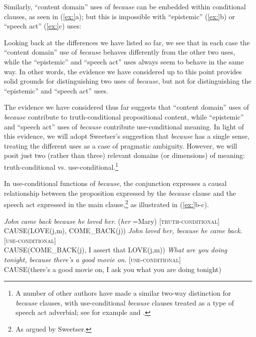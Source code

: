Similarly, “content domain” uses of \textit{because} can be embedded within conditional clauses, as seen in (\ref{ex:}a); but this is impossible with “epistemic” (\ref{ex:}b) or “speech act” (\ref{ex:}c) uses:


\ea
{}
\z \z


Looking back at the differences we have listed so far, we see that in each case the “content domain” use of \textit{because} behaves differently from the other two uses, while the “epistemic” and “speech act” uses always seem to behave in the same way. In other words, the evidence we have considered up to this point provides solid grounds for distinguishing two uses of \textit{because}, but not for distinguishing the “epistemic” and “speech act” uses.



The evidence we have considered thus far suggests that “content domain” uses of \textit{because} contribute to truth-conditional propositional content, while “epistemic” and “speech act” uses of \textit{because} contribute use-conditional meaning. In light of this evidence, we will adopt Sweetser’s suggestion that \textit{because} has a single sense, treating the different uses as a case of pragmatic ambiguity. However, we will posit just two (rather than three) relevant domains (or dimensions) of meaning: truth-conditional vs. use-conditional.\footnote{A number of other authors have made a similar two-way distinction for \textit{because} clauses, with use-conditional \textit{because} clauses treated as a type of speech act adverbial; see for example \citet{Scheffler2008,Scheffler2013} and \citet{ThompsonLongacreHwang2007}.} 



In use-conditional functions of \textit{because}, the conjunction expresses a causal relationship between the proposition expressed by the \textit{because} clause and the speech act expressed in the main clause,\footnote{As argued by Sweetser.} as illustrated in (\ref{ex:}b-c).


\ea
\ea \textit{John came back because he loved her}. (\textit{her} =Mary)  [\textsc{truth-conditional}]\\
CAUSE(LOVE(j,m), COME\_BACK(j))
\ex   \textit{John loved her, because he came back}.   [\textsc{use-conditional}]\\
CAUSE(COME\_BACK(j), I assert that LOVE(j,m))
\ex   \textit{What are you doing tonight, because there’s a good movie on}.  [\textsc{use-conditional}]\\
CAUSE(there’s a good movie on, I ask you what you are doing tonight)
\z \z


